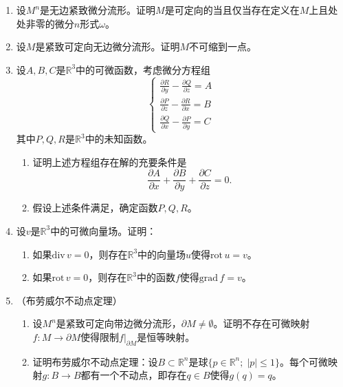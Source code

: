 \documentclass[12pt,a4paper]{ctexbook}
\begin{document}
\begin{enumerate}
\begin{enumerate}[label=\alph*)]
        \item （最大值原理）设$f$是闭有界区域$M\subset\mathbb{R}^3$中的非常值调和函数（即$M$是有界连通开集与其边界的并，边界不一定正则）。则$f$在$M$的边界$\partial M$上达到最大值和最小值。
    \end{enumerate}
    
    \item 设$M^n$是无边紧致微分流形。证明$M$是可定向的当且仅当存在定义在$M$上且处处非零的微分$n$形式$\omega$。
    
    \item 设$M$是紧致可定向无边微分流形。证明$M$不可缩到一点。
    
    \item 设$A,B,C$是$\mathbb{R}^3$中的可微函数，考虑微分方程组
    $$\begin{cases}
    \frac{\partial R}{\partial y} - \frac{\partial Q}{\partial z} = A \\
    \frac{\partial P}{\partial z} - \frac{\partial R}{\partial x} = B \\
    \frac{\partial Q}{\partial x} - \frac{\partial P}{\partial y} = C
    \end{cases}$$
    其中$P,Q,R$是$\mathbb{R}^3$中的未知函数。
    \begin{enumerate}[label=\alph*)]
        \item 证明上述方程组存在解的充要条件是
        $$\frac{\partial A}{\partial x} + \frac{\partial B}{\partial y} + \frac{\partial C}{\partial z} = 0.$$
        
        \item 假设上述条件满足，确定函数$P,Q,R$。
    \end{enumerate}
    
    \item 设$v$是$\mathbb{R}^3$中的可微向量场。证明：
    \begin{enumerate}[label=\alph*)]
        \item 如果$\text{div}\,v = 0$，则存在$\mathbb{R}^3$中的向量场$u$使得$\text{rot}\,u = v$。
        
        \item 如果$\text{rot}\,v = 0$，则存在$\mathbb{R}^3$中的函数$f$使得$\text{grad}\,f = v$。
    \end{enumerate}
    
    \item （布劳威尔不动点定理）
    \begin{enumerate}[label=\alph*)]
        \item 设$M^n$是紧致可定向带边微分流形，$\partial M\neq\emptyset$。证明不存在可微映射$f:M\to\partial M$使得限制$f|_{\partial M}$是恒等映射。
        
        \item 证明布劳威尔不动点定理：设$B\subset\mathbb{R}^n$是球$\{p\in\mathbb{R}^n;\; |p|\leq 1\}$。每个可微映射$g:B\to B$都有一个不动点，即存在$q\in B$使得$g(q)=q$。
    \end{enumerate}
\end{enumerate}
\end{document}
